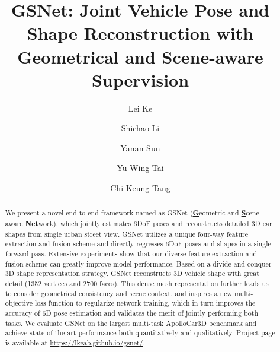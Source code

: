 \documentclass[runningheads]{llncs}
\begin{document}
\pagestyle{headings}
\mainmatter
\def\ECCVSubNumber{2393}  \title{GSNet: Joint Vehicle Pose and Shape Reconstruction with Geometrical and Scene-aware Supervision} 

\begin{comment}
\titlerunning{ECCV-20 submission ID \ECCVSubNumber} 
\authorrunning{ECCV-20 submission ID \ECCVSubNumber} 
\author{Anonymous ECCV submission}
\institute{Paper ID \ECCVSubNumber}
\end{comment}


\author{Lei Ke \and
Shichao Li \and
Yanan Sun \and 
Yu-Wing Tai \and 
Chi-Keung Tang}
\maketitle

\begin{abstract}	
	We present a novel end-to-end framework named as GSNet (\textbf{\underline{G}}eometric and \textbf{\underline{S}}cene-aware \underline{\textbf{Net}}work), which jointly estimates 6DoF poses and reconstructs detailed 3D car shapes from single urban street view. GSNet utilizes a unique four-way feature extraction and fusion scheme and directly regresses 6DoF poses and shapes in a single forward pass. Extensive experiments show that our diverse feature extraction and fusion scheme can greatly improve model performance. Based on a divide-and-conquer 3D shape representation strategy, GSNet reconstructs 3D vehicle shape with great detail (1352 vertices and 2700 faces). This dense mesh representation further leads us to consider geometrical consistency and scene context, and inspires a new multi-objective loss function to regularize network training, which in turn improves the accuracy of 6D pose estimation and validates the merit of jointly performing both tasks. We evaluate GSNet on the largest multi-task ApolloCar3D benchmark and achieve state-of-the-art performance both quantitatively and qualitatively. Project page is available at \url{https://lkeab.github.io/gsnet/}.


 \end{abstract}
\end{document}
